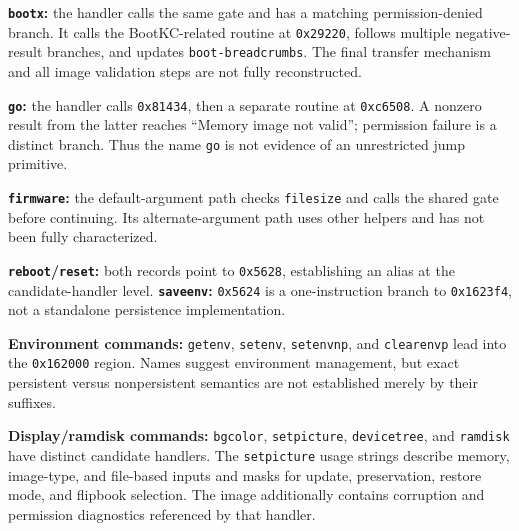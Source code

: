\documentclass[11pt]{article}
\newcommand{\off}[1]{\texttt{0x#1}}
\begin{document}
\textbf{\texttt{bootx}:} the handler calls the same gate and has a matching
permission-denied branch. It calls the BootKC-related routine at
\off{29220}, follows multiple negative-result branches, and updates
\texttt{boot-breadcrumbs}. The final transfer mechanism and all image
validation steps are not fully reconstructed.

\textbf{\texttt{go}:} the handler calls \off{81434}, then a separate routine
at \off{c6508}. A nonzero result from the latter reaches ``Memory image not
valid''; permission failure is a distinct branch. Thus the name \texttt{go}
is not evidence of an unrestricted jump primitive.

\textbf{\texttt{firmware}:} the default-argument path checks \texttt{filesize}
and calls the shared gate before continuing. Its alternate-argument path
uses other helpers and has not been fully characterized.

\textbf{\texttt{reboot}/\texttt{reset}:} both records point to
\off{5628}, establishing an alias at the candidate-handler level.
\textbf{\texttt{saveenv}:} \off{5624} is a one-instruction branch to
\off{1623f4}, not a standalone persistence implementation.

\textbf{Environment commands:} \texttt{getenv}, \texttt{setenv},
\texttt{setenvnp}, and \texttt{clearenvp} lead into the \off{162000}
region. Names suggest environment management, but exact persistent versus
nonpersistent semantics are not established merely by their suffixes.

\textbf{Display/ramdisk commands:} \texttt{bgcolor}, \texttt{setpicture},
\texttt{devicetree}, and \texttt{ramdisk} have distinct candidate handlers.
The \texttt{setpicture} usage strings describe memory, image-type, and
file-based inputs and masks for update, preservation, restore mode, and
flipbook selection. The image additionally contains corruption and
permission diagnostics referenced by that handler.
\end{document}
